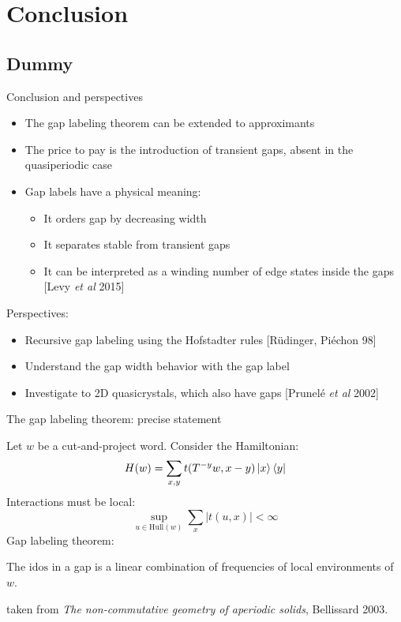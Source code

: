 \documentclass[xcolor=x11names,compress,professionalfonts]{beamer}
\renewcommand{\(}{\begin{columns}}
\renewcommand{\)}{\end{columns}}
\newcommand{\<}[1]{\begin{column}{#1}}
\renewcommand{\>}{\end{column}}
\newcommand{\id}{\ensuremath{\text{idos}}}
\begin{document}
\section{Conclusion}
\subsection{Dummy}
\begin{frame}{Conclusion and perspectives}
\begin{itemize}
	\item The gap labeling theorem can be extended to approximants
	\item The price to pay is the introduction of transient gaps, absent in the quasiperiodic case
	\item Gap labels have a physical meaning:
	\begin{itemize}
		\item It orders gap by decreasing width
		\item It separates stable from transient gaps
		\item It can be interpreted as a winding number of edge states inside the gaps \small{[Levy \emph{et al} 2015]}
	\end{itemize}
\end{itemize}
Perspectives:
\begin{itemize}
	\item Recursive gap labeling using the Hofstadter rules  \small{[Rüdinger, Piéchon 98]}
	\item Understand the gap width behavior with the gap label
	\item Investigate to 2D quasicrystals, which also have gaps \small{[Prunelé \emph{et al} 2002]}
\end{itemize}
\end{frame}

\begin{frame}{The gap labeling theorem: precise statement}

Let $w$ be a cut-and-project word.
Consider the Hamiltonian:
\[
	H(w) = \sum_{x,y} t( T^{-y}w, x-y) \ket{x} \bra{y}
\]
Interactions must be local:
\[
	\sup_{u \in \text{Hull}(w)} \sum_x |t(u, x)| < \infty
\]
Gap labeling theorem:

The $\id$ in a gap is a linear combination of frequencies of local environments of $w$.
{\flushright
\small{taken from \textit{The non-commutative geometry of aperiodic solids}, Bellissard 2003.}

}
\end{frame}
\end{document}
